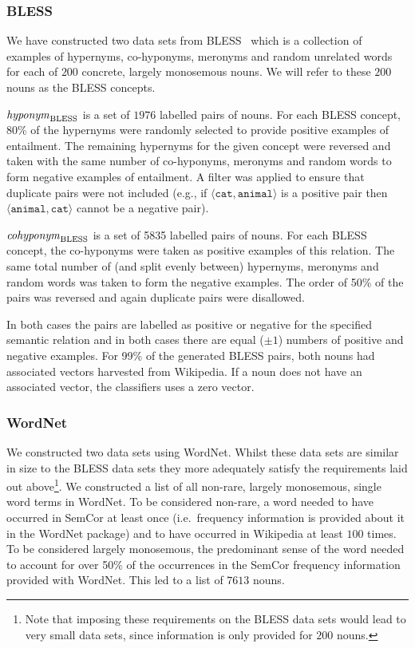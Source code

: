 \documentclass[11pt]{article}
\newcommand\entBLESS{\mbox{\em hyponym\/}_{\mbox{\scriptsize BLESS}}}
\newcommand\coordBLESS{\mbox{\em cohyponym\/}_{\mbox{\scriptsize BLESS}}}
\begin{document}
\subsubsection{BLESS}

We have constructed two  data sets from BLESS~\cite{Baroni2011} which is a collection of examples of hypernyms, co-hyponyms, meronyms and random unrelated words for each of $200$ concrete, largely monosemous nouns. We will refer to these $200$ nouns as the BLESS concepts.

\smallskip

\noindent $\entBLESS$ is a set of $1976$ labelled pairs of nouns.  For each BLESS concept, 80\% of the hypernyms were randomly selected to provide positive examples of entailment.  The remaining hypernyms for the given concept were reversed and taken with the same number of co-hyponyms, meronyms and random words to form negative examples of entailment.  A filter was applied to ensure that duplicate pairs were not included (e.g., if $\langle\texttt{cat},\texttt{animal}\rangle$ is a positive pair then $\langle\texttt{animal},\texttt{cat}\rangle$ cannot be a negative pair). 

\smallskip

\noindent $\coordBLESS$ is a set of 5835 labelled pairs of nouns.  For each BLESS concept, the co-hyponyms were taken as positive examples of this relation.  The same total number of (and split evenly between) hypernyms, meronyms and random words was taken to form the negative examples.  The order of 50\% of the pairs was reversed and again duplicate pairs were disallowed. 

\smallskip

In both cases the pairs are labelled as positive or negative for the specified semantic relation and in both cases there are equal ($\pm 1$) numbers of positive and negative examples.  For 99\% of the generated BLESS pairs, both nouns had associated vectors harvested from Wikipedia.  If a noun does not have an associated vector, the classifiers uses a zero vector.  

\subsubsection{WordNet}

We  constructed two data sets using WordNet.  Whilst these data sets are similar in size to the BLESS data sets they more adequately satisfy the requirements laid out above\footnote{Note that imposing these requirements on the BLESS data sets would lead to very small data sets, since information is only provided for $200$ nouns.}.  We constructed a list of all non-rare, largely monosemous, single word terms in WordNet.  To be considered non-rare, a word needed to have occurred in SemCor at least once (i.e.~frequency information is provided about it in the WordNet package) and to have occurred in Wikipedia at least $100$ times.  To be considered largely monosemous, the predominant sense of the word needed to account for over 50\% of the occurrences in the SemCor frequency information provided with WordNet.  This led to a list of $7613$ nouns. 
\end{document}
